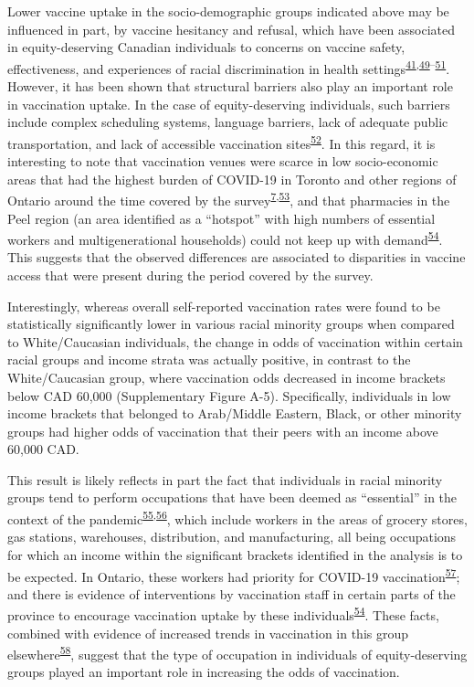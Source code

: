 \documentclass[
  letterpaper,
  DIV=11,
  numbers=noendperiod]{scrartcl}
\begin{document}
Lower vaccine uptake in the socio-demographic groups indicated above may
be influenced in part, by vaccine hesitancy and refusal, which have been
associated in equity-deserving Canadian individuals to concerns on
vaccine safety, effectiveness, and experiences of racial discrimination
in health
settings\textsuperscript{\protect\hyperlink{ref-cnat2022a}{41},\protect\hyperlink{ref-basta2022}{49}--\protect\hyperlink{ref-cnat2023}{51}}.
However, it has been shown that structural barriers also play an
important role in vaccination uptake. In the case of equity-deserving
individuals, such barriers include complex scheduling systems, language
barriers, lack of adequate public transportation, and lack of accessible
vaccination
sites\textsuperscript{\protect\hyperlink{ref-njoku2021}{52}}. In this
regard, it is interesting to note that vaccination venues were scarce in
low socio-economic areas that had the highest burden of COVID-19 in
Toronto and other regions of Ontario around the time covered by the
survey\textsuperscript{\protect\hyperlink{ref-bogoch2022}{7},\protect\hyperlink{ref-iveniuk2021}{53}},
and that pharmacies in the Peel region (an area identified as a
``hotspot'' with high numbers of essential workers and multigenerational
households) could not keep up with
demand\textsuperscript{\protect\hyperlink{ref-gill2022}{54}}. This
suggests that the observed differences are associated to disparities in
vaccine access that were present during the period covered by the
survey.

Interestingly, whereas overall self-reported vaccination rates were
found to be statistically significantly lower in various racial minority
groups when compared to White/Caucasian individuals, the change in odds
of vaccination within certain racial groups and income strata was
actually positive, in contrast to the White/Caucasian group, where
vaccination odds decreased in income brackets below CAD 60,000
(Supplementary Figure A-5). Specifically, individuals in low income
brackets that belonged to Arab/Middle Eastern, Black, or other minority
groups had higher odds of vaccination that their peers with an income
above 60,000 CAD.

This result is likely reflects in part the fact that individuals in
racial minority groups tend to perform occupations that have been deemed
as ``essential'' in the context of the
pandemic\textsuperscript{\protect\hyperlink{ref-hawkins2020}{55},\protect\hyperlink{ref-ct2021}{56}},
which include workers in the areas of grocery stores, gas stations,
warehouses, distribution, and manufacturing, all being occupations for
which an income within the significant brackets identified in the
analysis is to be expected. In Ontario, these workers had priority for
COVID-19
vaccination\textsuperscript{\protect\hyperlink{ref-mishra2021}{57}}; and
there is evidence of interventions by vaccination staff in certain parts
of the province to encourage vaccination uptake by these
individuals\textsuperscript{\protect\hyperlink{ref-gill2022}{54}}. These
facts, combined with evidence of increased trends in vaccination in this
group
elsewhere\textsuperscript{\protect\hyperlink{ref-nguyen2021b}{58}},
suggest that the type of occupation in individuals of equity-deserving
groups played an important role in increasing the odds of vaccination.
\end{document}

